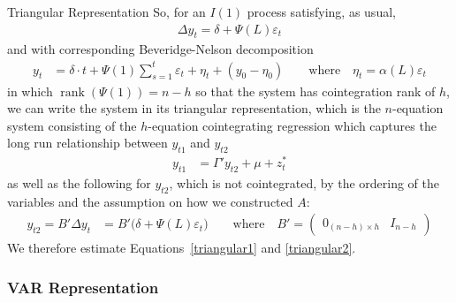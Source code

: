 \documentclass[aspectratio=169, handout]{beamer}
\newcommand{\rank}{\operatorname{rank}}
\begin{document}
{\footnotesize
\begin{frame}{Triangular Representation}
So, for an $I(1)$ process satisfying, as usual,
\begin{align*}
  \Delta y_t = \delta + \Psi(L)\varepsilon_t
\end{align*}
and with corresponding Beveridge-Nelson decomposition
\begin{align*}
  y_t
  &=
  \delta \cdot t
  +
  \Psi(1)
  \sum_{s=1}^t
  \varepsilon_t
  +
  \eta_t
  +
  (y_0-\eta_0)
  \qquad\text{where}\quad
  \eta_t
  =
  \alpha(L)\varepsilon_t
\end{align*}
\pause
in which $\rank(\Psi(1))=n-h$ so that the system has cointegration rank
of $h$, we can write the system in its
\alert{triangular representation}, which is the $n$-equation system
consisting of the $h$-equation \alert{cointegrating regression} which
captures the long run relationship between $y_{t1}$ and $y_{t2}$
\begin{align}
  y_{t1}
  &=
  \Gamma' y_{t2}
  +
  \mu
  +
  z_t^*
  \label{triangular1}
\end{align}
\pause
as well as the following for $y_{t2}$, which is not cointegrated, by
the ordering of the variables and the assumption on how we constructed
$A$:
\begin{align}
  y_{t2}
  =
  B'\Delta y_t
  &=
  B'
  \big(
  \delta + \Psi(L)\varepsilon_t
  \big)
  \qquad\text{where}\quad
  B'
  =
  \begin{pmatrix}
    0_{(n-h)\times h} & I_{n-h}
  \end{pmatrix}
  \label{triangular2}
\end{align}
We therefore estimate Equations~\ref{triangular1} and \ref{triangular2}.
\end{frame}
}


\subsubsection{VAR Representation}
\end{document}

